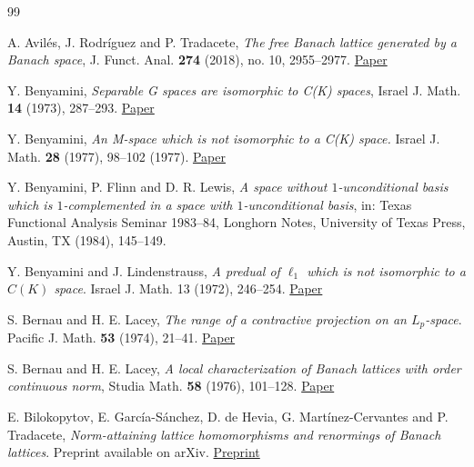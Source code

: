 \documentclass[11pt]{amsart}
\theoremstyle{definition}
\numberwithin{equation}{section}
\begin{document}
\begin{thebibliography}{99}




A. Avilés, J. Rodríguez and P. Tradacete, \emph{The free Banach lattice generated by a Banach space}, J. Funct. Anal. \textbf{274} (2018), no. 10, 2955--2977. \href{https://www.sciencedirect.com/science/article/pii/S002212361830096X}{Paper}

Y. Benyamini, \textit{Separable G spaces are isomorphic to C(K) spaces}, Israel J. Math. \textbf{14} (1973), 287--293. \href{https://link.springer.com/article/10.1007/BF02764890}{Paper}


Y. Benyamini, \textit{An M-space which is not isomorphic to a C(K) space.} Israel J. Math. \textbf{28} (1977), 98--102 (1977). \href{https://doi.org/10.1007/BF02759784}{Paper}



Y. Benyamini, P. Flinn and D. R. Lewis, \textit{A space without $1$-unconditional basis which is $1$-complemented in a space with $1$-unconditional basis}, in: Texas Functional Analysis Seminar 1983--84, Longhorn Notes, University of Texas Press, Austin, TX (1984), 145--149.

Y. Benyamini and J. Lindenstrauss, \emph{A predual of $\ell_1$ which is not isomorphic to a $C(K)$ space}. Israel J. Math. 13 (1972), 246--254. \href{https://link.springer.com/article/10.1007/BF02762798}{Paper}


S. Bernau and H. E. Lacey, \emph{The range of a contractive projection on an $L_p$-space}. Pacific J. Math. \textbf{53} (1974), 21--41.  \href{http://dx.doi.org/10.2140/pjm.1974.53.21}{Paper}


S. Bernau and H. E. Lacey, \emph{A local characterization of Banach lattices with order continuous norm},
Studia Math. \textbf{58} (1976), 101--128. \href{https://eudml.org/doc/218085}{Paper}




E. Bilokopytov, E. García-Sánchez, D. de Hevia, G. Martínez-Cervantes and P. Tradacete, \emph{Norm-attaining lattice homomorphisms and renormings of Banach lattices}. Preprint available on arXiv. \href{https://arxiv.org/abs/2502.10165}{Preprint}




\end{thebibliography}
\end{document}
